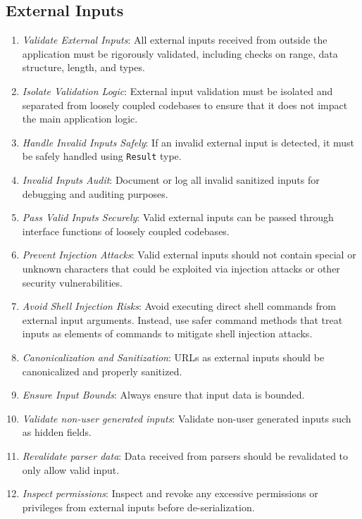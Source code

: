 \documentclass[9pt]{IEEEtran} %
\begin{document}
\subsection{External Inputs}
\label{ESSExternalInputs}

\begin{enumerate}
  \item \textit{Validate External Inputs}: All external inputs received from outside the application must be rigorously validated, including checks on range, data structure, length, and types.
  \item \textit{Isolate Validation Logic}: External input validation must be isolated and separated from loosely coupled codebases to ensure that it does not impact the main application logic.
  \item \textit{Handle Invalid Inputs Safely}: If an invalid external input is detected, it must be safely handled using \texttt{Result} type.
  \item \textit{Invalid Inputs Audit}: Document or log all invalid sanitized inputs for debugging and auditing purposes.
  \item \textit{Pass Valid Inputs Securely}: Valid external inputs can be passed through interface functions of loosely coupled codebases.
  \item \textit{Prevent Injection Attacks}: Valid external inputs should not contain special or unknown characters that could be exploited via injection attacks or other security vulnerabilities.
  \item \textit{Avoid Shell Injection Risks}: Avoid executing direct shell commands from external input arguments. Instead, use safer command methods that treat inputs as elements of commands to mitigate shell injection attacks.
  \item \textit{Canonicalization and Sanitization}: URLs as external inputs should be canonicalized and properly sanitized.
  \item \textit{Ensure Input Bounds}: Always ensure that input data is bounded.
  \item \textit{Validate non-user generated inputs}: Validate non-user generated inputs such as hidden fields.
  \item \textit{Revalidate parser data}: Data received from parsers should be revalidated to only allow valid input.
  \item \textit{Inspect permissions}: Inspect and revoke any excessive permissions or privileges from external inputs before de-serialization.
\end{enumerate}
\end{document}
